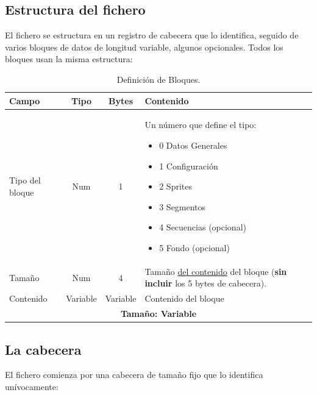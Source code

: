 \subsection{Estructura del fichero}
\label{sec:F5I2Estructura}

El fichero se estructura en un registro de cabecera que lo identifica, seguido de varios bloques de datos de longitud variable, algunos opcionales. Todos los bloques usan la misma estructura:

\begin{table}[H]
	\centering
	\begin{tabular}{|l|c|c|p{8.4cm}|}
		\hline
		\textbf{Campo} & \textbf{Tipo} & \textbf{Bytes} & \textbf{Contenido} \\
		\hline
		
		Tipo del bloque & Num & 1 & Un número que define el tipo:
		\begin{itemize}
			\item 0 Datos Generales
			\item 1 Configuración
			\item 2 Sprites
			\item 3 Segmentos
			\item 4 Secuencias (opcional)
			\item 5 Fondo (opcional)
		\end{itemize} \\ \hline
		
		Tamaño & Num & 4 & Tamaño \underline{del contenido} del bloque (\textbf{sin incluir} los 5 bytes de cabecera).\\ \hline
		
		Contenido & Variable & Variable & Contenido del bloque \\
		
		\hline\hline
		\multicolumn{4}{c}{\textbf{Tamaño: Variable}} \\ \hline
	\end{tabular}
	\caption{Definición de Bloques.}
	\label{tab:definicionBloques}
\end{table}

\subsection{La cabecera}
\label{sec:F5I2Cabecera}

El fichero comienza por una cabecera de tamaño fijo que lo identifica unívocamente:

